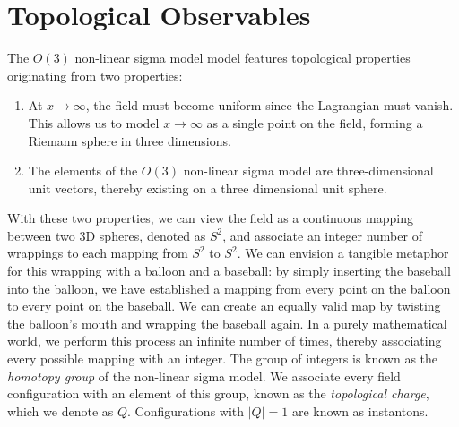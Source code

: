 \documentclass[12pt]{report}
\begin{document}
\section{Topological Observables}
\label{sec:topological charge}
The $O(3)$ non-linear sigma model model features topological properties originating from two properties: 
\begin{enumerate}
    \item At $x\rightarrow\infty$, the field must become uniform since the Lagrangian must vanish. This allows us to model $x\rightarrow\infty$ as a single point on the field, forming a Riemann sphere in three dimensions.
    \item The elements of the $O(3)$ non-linear sigma model are three-dimensional unit vectors, thereby existing on a three dimensional unit sphere. 
\end{enumerate}

With these two properties, we can view the field as a continuous mapping between two 3D spheres, denoted as $S^2$, and associate an integer number of wrappings to each mapping from $S^2$ to $S^2$. We can envision a tangible metaphor for this wrapping with a balloon and a baseball: by simply inserting the baseball into the balloon, we have established a mapping from every point on the balloon to every point on the baseball. We can create an equally valid map by twisting the balloon's mouth and wrapping the baseball again. In a purely mathematical world, we perform this process an infinite number of times, thereby associating every possible mapping with an integer. The group of integers is known as the \textit{homotopy group} of the non-linear sigma model. We associate every field configuration with an element of this group, known as the \textit{topological charge}, which we denote as $Q$. Configurations with $|Q|=1$ are known as instantons.
\end{document}

